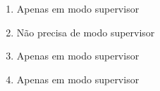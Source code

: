 \begin{question}

	\begin{enumerate}[label=\textbf{\alph*})]
		\item Apenas em modo supervisor
		\item Não precisa de modo supervisor
		\item Apenas em modo supervisor
		\item Apenas em modo supervisor
	\end{enumerate}
	
\end{question}
